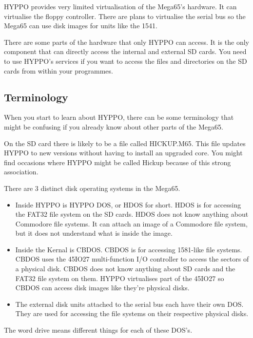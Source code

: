 HYPPO provides very limited virtualisation of the Mega65's hardware. It can
virtualise the floppy controller. There are plans to virtualise the serial bus
so the Mega65 can use disk images for units like the 1541.

There are some parts of the hardware that only HYPPO can access. It is the only
component that can directly access the internal and external SD cards. You need
to use HYPPO's services if you want to access the files and directories on the
SD cards from within your programmes.

\subsection{Terminology}

When you start to learn about HYPPO, there can be some terminology that might be
confusing if you already know about other parts of the Mega65.

On the SD card there is likely to be a file called HICKUP.M65. This file updates
HYPPO to new versions without having to install an upgraded core. You might find
occasions where HYPPO might be called Hickup because of this strong association.

There are 3 distinct disk operating systems in the Mega65.

\begin{itemize}
  \item Inside HYPPO is HYPPO DOS, or HDOS for short. HDOS is for accessing
        the FAT32 file system on the SD cards. HDOS does not know anything
        about Commodore file systems. It can attach an image of a Commodore
        file system, but it does not understand what is inside the image.
  \item Inside the Kernal is CBDOS. CBDOS is for accessing 1581-like file
        systems. CBDOS uses the 45IO27 multi-function I/O controller to access
        the sectors of a physical disk. CBDOS does not know anything about SD
        cards and the FAT32 file system on them. HYPPO virtualises part of the
        45IO27 so CBDOS can access disk images like they're physical disks.
  \item The external disk units attached to the serial bus each have their own
        DOS. They are used for accessing the file systems on their respective
        physical disks.
\end{itemize}

The word drive means different things for each of these DOS's.

